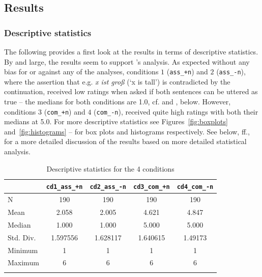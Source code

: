 \documentclass[output=paper,
modfonts
]{langscibook}
\begin{document}
\subsection{Results}

\subsubsection{Descriptive statistics}

The following provides a first look at the results in terms of descriptive statistics. By and large, the results seem to support \citeauthor{umbach2009a_comp}'s \citeyearpar{umbach2009a_comp} analysis. As expected without any bias for or against any of the analyses, conditions $1$ (\texttt{ass\_+n}) and $2$ (\texttt{\mbox{ass\_-n}}), where the assertion that e.g. \textit{x ist groß} (`x is tall') is contradicted by the continuation, received low ratings when asked if both sentences can be uttered as true -- the medians for both conditions are 1.0, cf.  and , below. However, conditions $3$ (\texttt{com\_+n}) and $4$ (\texttt{com\_-n}), received quite high ratings with both their medians at 5.0. For more descriptive statistics see Figures~\ref{fig:boxplots} and~\ref{fig:histograms} -- for box plots and histograms respectively. See below, ff., for a more detailed discussion of the results based on more detailed statistical analysis.

\begin{table}
\caption{Descriptive statistics for the 4 conditions}
\label{tab:descriptive_stats}
 \begin{tabular}{lSSSS} 
  \lsptoprule
	   & \texttt{cd1\_ass\_+n}	& \texttt{cd2\_ass\_-n}	& \texttt{cd3\_com\_+n}	& \texttt{cd4\_com\_-n}	\\ 
  \midrule
	N	        & 190		& 190		& 190		& 190		\\
	Mean	    & 2.058		& 2.005		& 4.621		& 4.847		\\
	Median	    & 1.000		& 1.000		& 5.000		& 5.000		\\
    Std. Div.	& 1.597556	& 1.628117	& 1.640615	& 1.49173	\\
	Minimum		& 1 		& 1 		& 1		    & 1		    \\
	Maximum		& 6	    	& 6	    	& 6		    & 6		    \\
  \lspbottomrule
 \end{tabular}
\end{table}
\end{document}
